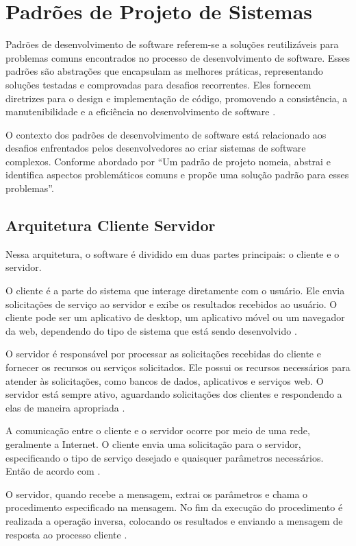\section{Padrões de Projeto de Sistemas}
Padrões de desenvolvimento de software referem-se a soluções reutilizáveis para problemas comuns encontrados no processo de desenvolvimento de software. Esses padrões são abstrações que encapsulam as melhores práticas, representando soluções testadas e comprovadas para desafios recorrentes. Eles fornecem diretrizes para o design e implementação de código, promovendo a consistência, a manutenibilidade e a eficiência no desenvolvimento de software \cite{padroesProjeto}.

O contexto dos padrões de desenvolvimento de software está relacionado aos desafios enfrentados pelos desenvolvedores ao criar sistemas de software complexos. Conforme abordado por  ``Um padrão de projeto nomeia, abstrai e identifica aspectos problemáticos comuns e propõe uma solução padrão para esses problemas''.


\subsection{Arquitetura Cliente Servidor}
Nessa arquitetura, o software é dividido em duas partes principais: o cliente e o servidor.

O cliente é a parte do sistema que interage diretamente com o usuário. Ele envia solicitações de serviço ao servidor e exibe os resultados recebidos ao usuário. O cliente pode ser um aplicativo de desktop, um aplicativo móvel ou um navegador da web, dependendo do tipo de sistema que está sendo desenvolvido \cite{flanagan2012javascript}.

O servidor é responsável por processar as solicitações recebidas do cliente e fornecer os recursos ou serviços solicitados. Ele possui os recursos necessários para atender às solicitações, como bancos de dados, aplicativos e serviços web. O servidor está sempre ativo, aguardando solicitações dos clientes e respondendo a elas de maneira apropriada \cite{arqClientServer2}.

A comunicação entre o cliente e o servidor ocorre por meio de uma rede, geralmente a Internet. O cliente envia uma solicitação para o servidor, especificando o tipo de serviço desejado e quaisquer parâmetros necessários.
Então de acordo com .
\begin{citacao}
O servidor, quando recebe a mensagem, extrai os parâmetros 
e chama o procedimento especificado na mensagem. No fim da execução do procedimento é 
realizada a operação inversa, colocando os resultados e enviando a mensagem de resposta ao 
processo cliente \cite{arqClientServer2}.
\end{citacao}

